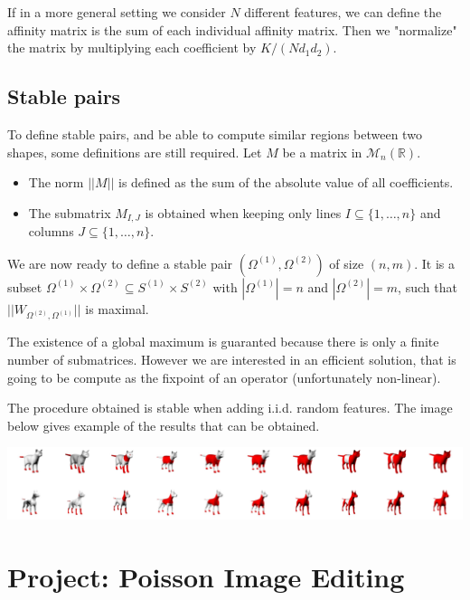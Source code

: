 \documentclass[a4paper]{article}
\begin{document}
  \medskip If in a more general setting we consider $N$ different features, we can define the affinity matrix is the sum of each individual affinity matrix. Then we "normalize" the matrix by multiplying each coefficient by $K/(Nd_1d_2)$.
  
  \subsection{Stable pairs}

  To define stable pairs, and be able to compute similar regions between two shapes, some definitions are still required. Let $M$ be a matrix in $\mathcal M_n(\mathbb R)$.
  \begin{itemize}
    \item The norm $||M||$ is defined as the sum of the absolute value of all coefficients.
    \item The submatrix $M_{I,J}$ is obtained when keeping only lines $I \subseteq \{1, \dots, n\}$ and columns $J \subseteq \{1, \dots, n\}$.
  \end{itemize}
  
  We are now ready to define a stable pair $(\Omega^{(1)}, \Omega^{(2)})$ of size $(n,m)$. It is a subset $\Omega^{(1)} \times \Omega^{(2)} \subseteq S^{(1)} \times S^{(2)}$ with $|\Omega^{(1)}| = n$ and $|\Omega^{(2)}| = m$, such that $||W_{\Omega^{(2)}, \Omega^{(1)}}||$ is maximal.
  
  \medskip The existence of a global maximum is guaranted because there is only a finite number of submatrices. However we are interested in an efficient solution, that is going to be compute as the fixpoint of an operator (unfortunately non-linear).
  
  \medskip The procedure obtained is stable when adding i.i.d. random features. The image below gives example of the results that can be obtained.
  
  \bigskip \includegraphics[width=\textwidth]{article/result.png}
  
  \newpage
  
  \section{Project: Poisson Image Editing}
  
\end{document}

